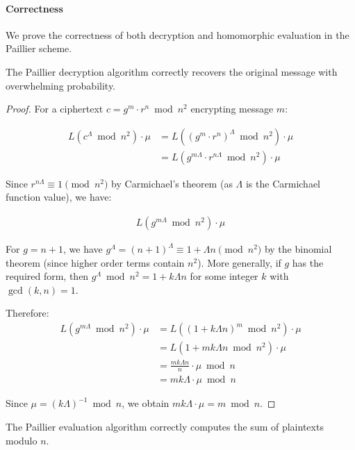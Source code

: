 \paragraph{Correctness}
We prove the correctness of both decryption and homomorphic evaluation in the Paillier scheme.

\begin{thm}
The Paillier decryption algorithm correctly recovers the original message with overwhelming probability.
\end{thm}

\begin{proof}
For a ciphertext $c = g^m \cdot r^n \bmod n^2$ encrypting message $m$:

\begin{align*}
L(c^\Lambda \bmod n^2) \cdot \mu &= L((g^m \cdot r^n)^\Lambda \bmod n^2) \cdot \mu \\
&= L(g^{m\Lambda} \cdot r^{n\Lambda} \bmod n^2) \cdot \mu
\end{align*}

Since $r^{n\Lambda} \equiv 1 \pmod{n^2}$ by Carmichael's theorem (as $\Lambda$ is the Carmichael function value), we have:

\begin{align*}
L(g^{m\Lambda} \bmod n^2) \cdot \mu
\end{align*}

For $g = n + 1$, we have $g^\Lambda = (n+1)^\Lambda \equiv 1 + \Lambda n \pmod{n^2}$ by the binomial theorem (since higher order terms contain $n^2$). More generally, if $g$ has the required form, then $g^\Lambda \bmod n^2 = 1 + k\Lambda n$ for some integer $k$ with $\gcd(k, n) = 1$.

Therefore:
\begin{align*}
L(g^{m\Lambda} \bmod n^2) \cdot \mu &= L((1 + k\Lambda n)^m \bmod n^2) \cdot \mu \\
&= L(1 + mk\Lambda n \bmod n^2) \cdot \mu \\
&= \frac{mk\Lambda n}{n} \cdot \mu \bmod n \\
&= mk\Lambda \cdot \mu \bmod n
\end{align*}

Since $\mu = (k\Lambda)^{-1} \bmod n$, we obtain $mk\Lambda \cdot \mu = m \bmod n$.
\end{proof}

\begin{thm}
The Paillier evaluation algorithm correctly computes the sum of plaintexts modulo $n$.
\end{thm}

